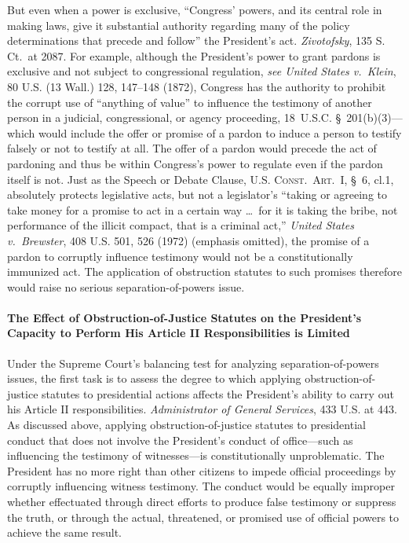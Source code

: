 But even when a power is exclusive, ``Congress' powers, and its central role in making laws, give it substantial authority regarding many of the policy determinations that precede and follow'' the President's act.
\textit{Zivotofsky}, 135 S. Ct.~at 2087.
For example, although the President's power to grant pardons is exclusive and not subject to congressional regulation, \textit{see United States v.\ Klein}, 80 U.S. (13 Wall.) 128, 147--148 (1872), Congress has the authority to prohibit the corrupt use of ``anything of value'' to influence the testimony of another person in a judicial, congressional, or agency proceeding, 18~U.S.C. \S~201(b)(3)---which would include the offer or promise of a pardon to induce a person to testify falsely or not to testify at all.
The offer of a pardon would precede the act of pardoning and thus be within Congress's power to regulate even if the pardon itself is not.
Just as the Speech or Debate Clause, \textsc{U.S. Const.\ Art.~I}, \S~6, cl.1, absolutely protects legislative acts, but not a legislator's ``taking or agreeing to take money for a promise to act in a certain way \dots\ for it is taking the bribe, not performance of the illicit compact, that is a criminal act,'' \textit{United States v.\ Brewster}, 408 U.S. 501, 526 (1972) (emphasis omitted), the promise of a pardon to corruptly influence testimony would not be a constitutionally immunized act.
The application of obstruction statutes to such promises therefore would raise no serious separation-of-powers issue.

\paragraph{The Effect of Obstruction-of-Justice Statutes on the President's Capacity to Perform His Article II Responsibilities is Limited}

Under the Supreme Court's balancing test for analyzing separation-of-powers issues, the first task is to assess the degree to which applying obstruction-of-justice statutes to presidential actions affects the President's ability to carry out his Article II responsibilities.
\textit{Administrator of General Services}, 433 U.S. at 443.
As discussed above, applying obstruction-of-justice statutes to presidential conduct that does not involve the President's conduct of office---such as influencing the testimony of witnesses---is constitutionally unproblematic.
The President has no more right than other citizens to impede official proceedings by corruptly influencing witness testimony.
The conduct would be equally improper whether effectuated through direct efforts to produce false testimony or suppress the truth, or through the actual, threatened, or promised use of official powers to achieve the same result.

